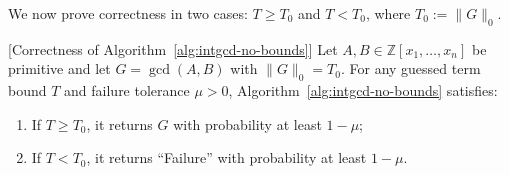 \documentclass{article}
\numberwithin{equation}{section}
\begin{document}
We now prove correctness in two cases: $T \ge T_0$ and $T < T_0$, where $T_0 := \|G\|_0$.

\begin{theorem}\label{thm:intgcd-no-bounds-correctness}[Correctness of Algorithm~\ref{alg:intgcd-no-bounds}]
Let $A, B \in \mathbb{Z}[x_1,\dots,x_n]$ be primitive and let $G = \gcd(A,B)$ with $\|G\|_0 = T_0$. For any guessed term bound $T$ and failure tolerance $\mu > 0$, Algorithm~\ref{alg:intgcd-no-bounds} satisfies:
\begin{enumerate}
    \item If $T \ge T_0$, it returns $G$ with probability at least $1-\mu$;
    \item If $T < T_0$, it returns ``Failure'' with probability at least $1-\mu$.
\end{enumerate}
\end{theorem}
\end{document}
